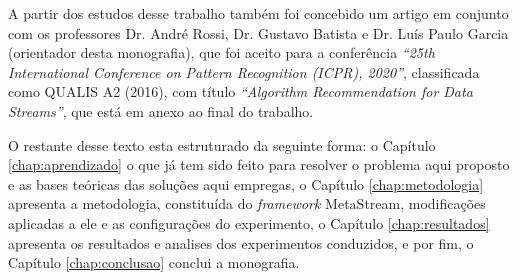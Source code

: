 A partir dos estudos desse trabalho também foi concebido um artigo em conjunto com os professores Dr. André Rossi, Dr. Gustavo Batista e Dr. Luís Paulo Garcia (orientador desta monografia), que foi aceito para a conferência \textit{``25th International Conference on Pattern Recognition (ICPR), 2020''}, classificada como QUALIS A2 (2016), com título \textit{``Algorithm Recommendation for Data Streams''}, que está em anexo ao final do trabalho. 

O restante desse texto esta estruturado da seguinte forma: o Capítulo \ref{chap:aprendizado} o que já tem sido feito para resolver o problema aqui proposto e as bases teóricas das soluções aqui empregas, o Capítulo \ref{chap:metodologia} apresenta a metodologia, constituída do \textit{framework} MetaStream, modificações aplicadas a ele e as configurações do experimento, o Capítulo \ref{chap:resultados} apresenta os resultados e analises dos experimentos conduzidos, e por fim, o Capítulo \ref{chap:conclusao} conclui a monografia.